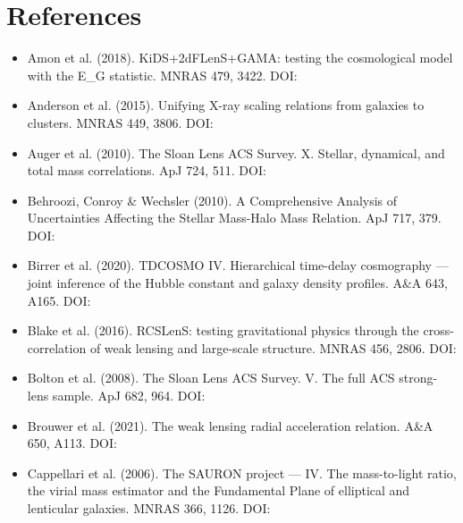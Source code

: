 \documentclass[11pt,a4paper]{article}
\begin{document}
\section{References}
\label{sec:references}
\begin{itemize}
  \item Amon et al. (2018). KiDS+2dFLenS+GAMA: testing the cosmological model with the E\_\allowbreak{}G statistic. MNRAS 479, 3422. DOI: \href{https://doi.org/10.1093/mnras/sty1624}{{\small\protect{}}}
  \item Anderson et al. (2015). Unifying X-ray scaling relations from galaxies to clusters. MNRAS 449, 3806. DOI: \href{https://doi.org/10.1093/mnras/stv437}{{\small\protect{}}}
  \item Auger et al. (2010). The Sloan Lens ACS Survey. X. Stellar, dynamical, and total mass correlations. ApJ 724, 511. DOI: \href{https://doi.org/10.1088/0004-637X/724/1/511}{{\small\protect{}}}
  \item Behroozi, Conroy \& Wechsler (2010). A Comprehensive Analysis of Uncertainties Affecting the Stellar Mass-Halo Mass Relation. ApJ 717, 379. DOI: \href{https://doi.org/10.1088/0004-637X/717/1/379}{{\small\protect{}}}
  \item Birrer et al. (2020). TDCOSMO IV. Hierarchical time-delay cosmography --- joint inference of the Hubble constant and galaxy density profiles. A\&A 643, A165. DOI: \href{https://doi.org/10.1051/0004-6361/202038861}{{\small\protect{}}}
  \item Blake et al. (2016). RCSLenS: testing gravitational physics through the cross-correlation of weak lensing and large-scale structure. MNRAS 456, 2806. DOI: \href{https://doi.org/10.1093/mnras/stv2875}{{\small\protect{}}}
  \item Bolton et al. (2008). The Sloan Lens ACS Survey. V. The full ACS strong-lens sample. ApJ 682, 964. DOI: \href{https://doi.org/10.1086/589327}{{\small\protect{}}}
  \item Brouwer et al. (2021). The weak lensing radial acceleration relation. A\&A 650, A113. DOI: \href{https://doi.org/10.1051/0004-6361/202039795}{{\small\protect{}}}
  \item Cappellari et al. (2006). The SAURON project --- IV. The mass-to-light ratio, the virial mass estimator and the Fundamental Plane of elliptical and lenticular galaxies. MNRAS 366, 1126. DOI: \href{https://doi.org/10.1111/j.1365-2966.2005.09981.x}{{\small\protect{}}}

\end{itemize}
\end{document}
